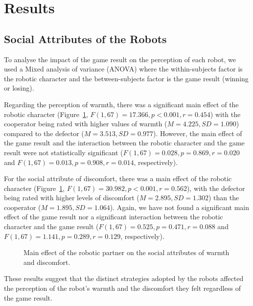 \section{Results}
\label{sec:study3-results}
\subsection{Social Attributes of the Robots}
To analyse the impact of the game result on the perception of each robot, we used a Mixed analysis of variance (ANOVA) where the within-subjects factor is the robotic character and the between-subjects factor is the game result (winning or losing).

Regarding the perception of warmth, there was a significant main effect of the robotic character (Figure~\ref{fig:main-effects}, $F(1,67)=17.366, p<0.001, r=0.454$) with the cooperator being rated with higher values of warmth ($M=4.225, SD=1.090$) compared to the defector ($M=3.513, SD=0.977$). However, the main effect of the game result and the interaction between the robotic character and the game result were not statistically significant ($F(1,67)=0.028, p=0.869, r=0.020$ and $F(1,67)=0.013, p=0.908, r=0.014$, respectively).

For the social attribute of discomfort, there was a main effect of the robotic character (Figure~\ref{fig:main-effects}, $F(1,67)=30.982, p<0.001, r=0.562$), with the defector being rated with higher levels of discomfort ($M=2.895, SD=1.302$) than the cooperator ($M=1.895, SD=1.064$). Again, we have not found a significant main effect of the game result nor a significant interaction between the robotic character and the game result ($F(1,67)=0.525, p=0.471, r=0.088$ and $F(1,67)=1.141, p=0.289, r=0.129$, respectively).


\begin{figure}[ht]
\centering

\caption{Main effect of the robotic partner on the social attributes of warmth and discomfort.}
\label{fig:main-effects}
\end{figure}

These results suggest that the distinct strategies adopted by the robots affected the perception of the robot's warmth and the discomfort they felt regardless of the game result.

